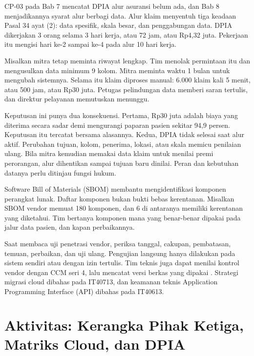 \begin{kasus}[title={Kasus Medikara Health: DPIA Alur Asuransi}]
CP-03 pada Bab 7 mencatat DPIA alur asuransi belum ada, dan Bab 8 menjadikannya syarat alur berbagi
data. Alur klaim menyentuh tiga keadaan Pasal 34 ayat (2): data spesifik, skala besar, dan
penggabungan data. DPIA dikerjakan 3 orang selama 3 hari kerja, atau 72 jam, atau Rp4,32 juta.
Pekerjaan itu mengisi hari ke-2 sampai ke-4 pada alur 10 hari kerja.

Misalkan mitra tetap meminta riwayat lengkap. Tim menolak permintaan itu dan mengusulkan data
minimum 9 kolom. Mitra meminta waktu 1 bulan untuk mengubah sistemnya. Selama itu klaim diproses
manual: 6.000 klaim kali 5 menit, atau 500 jam, atau Rp30 juta. Petugas pelindungan data memberi
saran tertulis, dan direktur pelayanan memutuskan menunggu.

Keputusan ini punya dua konsekuensi. Pertama, Rp30 juta adalah biaya yang diterima secara sadar demi
mengurangi paparan pasien sekitar 94,9 persen. Keputusan itu tercatat bersama alasannya. Kedua, DPIA
tidak selesai saat alur aktif. Perubahan tujuan, kolom, penerima, lokasi, atau skala memicu
penilaian ulang. Bila mitra kemudian memakai data klaim untuk menilai premi perorangan, alur
dihentikan sampai tujuan baru dinilai. Peran dan kebutuhan datanya perlu ditinjau fungsi hukum.
\end{kasus}

\begin{pendalaman}
Software Bill of Materials (SBOM) membantu mengidentifikasi komponen perangkat lunak. Daftar
komponen bukan bukti bebas kerentanan. Misalkan SBOM vendor memuat 180 komponen, dan 6 di antaranya
memiliki kerentanan yang diketahui. Tim bertanya komponen mana yang benar-benar dipakai pada jalur
data pasien, dan kapan perbaikannya.

Saat membaca uji penetrasi vendor, periksa tanggal, cakupan, pembatasan, temuan, perbaikan, dan uji
ulang. Pengujian langsung hanya dilakukan pada sistem sendiri atau dengan izin tertulis. Tim teknis
juga dapat menilai kontrol vendor dengan CCM seri 4, lalu mencatat versi berkas yang dipakai
\cite{c09-ccm}. Strategi migrasi cloud dibahas pada IT40713, dan keamanan teknis Application
Programming Interface (API) dibahas pada IT40613.
\end{pendalaman}

\section{Aktivitas: Kerangka Pihak Ketiga, Matriks Cloud, dan DPIA}

